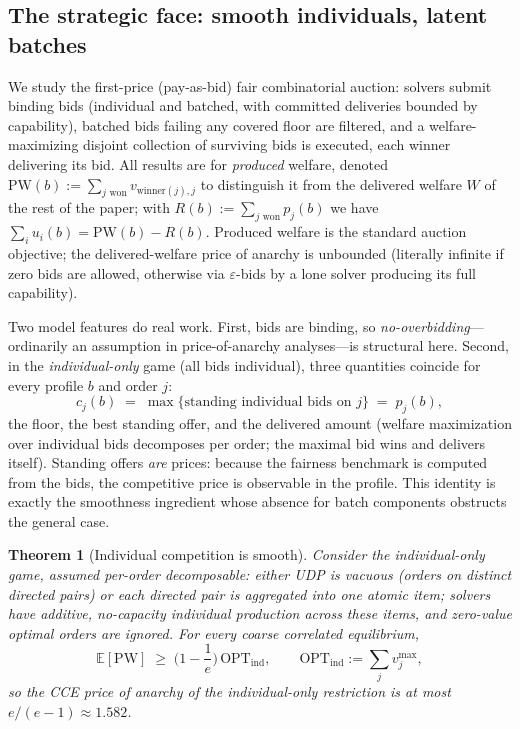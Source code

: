 \documentclass[11pt]{article}
\newtheorem{theorem}{Theorem}
\theoremstyle{remark}
\newcommand{\OPT}{\mathrm{OPT}}
\newcommand{\PW}{\mathrm{PW}}
\newcommand{\E}{\mathbb{E}}
\begin{document}
\subsection{The strategic face: smooth individuals, latent batches}
\label{sec:poa}

We study the first-price (pay-as-bid) fair combinatorial auction: solvers
submit binding bids (individual and batched, with committed deliveries
bounded by capability), batched bids failing any covered floor are
filtered, and a welfare-maximizing disjoint collection of surviving bids
is executed, each winner delivering its bid. All results are for
\emph{produced} welfare, denoted
$\PW(b):=\sum_{j\text{ won}}v_{\mathrm{winner}(j),j}$ to distinguish it
from the delivered welfare $W$ of the rest of the paper; with
$R(b):=\sum_{j\text{ won}}p_j(b)$ we have
$\sum_iu_i(b)=\PW(b)-R(b)$. Produced welfare is the standard auction
objective; the delivered-welfare price of anarchy is unbounded (literally
infinite if zero bids are allowed, otherwise via $\varepsilon$-bids by a
lone solver producing its full capability).

Two model features do real work. First, bids are binding, so
\emph{no-overbidding}---ordinarily an assumption in price-of-anarchy
analyses---is structural here. Second, in the \emph{individual-only} game
(all bids individual), three quantities coincide for every profile $b$
and order $j$:
\[
c_j(b)\;=\;\max\{\text{standing individual bids on }j\}\;=\;p_j(b),
\]
the floor, the best standing offer, and the delivered amount (welfare
maximization over individual bids decomposes per order; the maximal bid
wins and delivers itself). Standing offers \emph{are} prices: because the
fairness benchmark is computed from the bids, the competitive price is
observable in the profile. This identity is exactly the smoothness
ingredient whose absence for batch components obstructs the general case.

\begin{theorem}[Individual competition is smooth]\label{thm:indpoa}
Consider the individual-only game, assumed per-order decomposable: either
UDP is vacuous (orders on distinct directed pairs) or each directed pair
is aggregated into one atomic item; solvers have additive, no-capacity
individual production across these items, and zero-value optimal orders
are ignored. For every coarse correlated equilibrium,
\[
\E[\PW]\;\ge\;\Big(1-\frac1e\Big)\,\OPT_{\mathrm{ind}},
\qquad
\OPT_{\mathrm{ind}}:=\sum_j v^{\max}_j,
\]
so the CCE price of anarchy of the individual-only restriction is at most
$e/(e-1)\approx1.582$.
\end{theorem}
\end{document}

